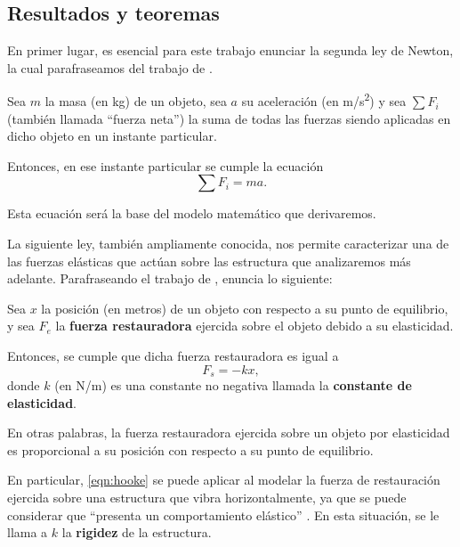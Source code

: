 \subsection{Resultados y teoremas}

En primer lugar, es esencial para este trabajo enunciar la segunda ley de Newton, la cual parafraseamos del trabajo de \citet{young}.

\begin{theorem}
    Sea \(m\) la masa (en \si{kg}) de un objeto, sea \(a\) su aceleración (en \si{m/s^2}) y sea \(\sum F_i\) (también llamada ``fuerza neta'') la suma de todas las fuerzas siendo aplicadas en dicho objeto en un instante particular.
    
        Entonces, en ese instante particular se cumple la ecuación
        \[
            \sum F_i = ma
        .\]
\end{theorem}

Esta ecuación será la base del modelo matemático que derivaremos.

La siguiente ley, también ampliamente conocida, nos permite caracterizar una de las fuerzas elásticas que actúan sobre las estructura que analizaremos más adelante. Parafraseando el trabajo de \citet{giuli}, enuncia lo siguiente:

\begin{theorem}
    Sea \(x\) la posición (en metros) de un objeto con respecto a su punto de equilibrio, y sea \(F_e\) la \textbf{fuerza restauradora} ejercida sobre el objeto debido a su elasticidad.
    
        Entonces, se cumple que dicha fuerza restauradora es igual a
        \begin{equation}\label{eqn:hooke}
            F_{s} = -kx
        ,\end{equation}
        donde \(k\) (en \si{N/m}) es una constante no negativa llamada la \textbf{constante de elasticidad}.
\end{theorem}

En otras palabras, la fuerza restauradora ejercida sobre un objeto por elasticidad es proporcional a su posición con respecto a su punto de equilibrio.

En particular, \eqref{eqn:hooke} se puede aplicar al modelar la fuerza de restauración ejercida sobre una estructura que vibra horizontalmente, ya que se puede considerar que ``presenta un comportamiento elástico'' \citep{tarque}. En esta situación, se le llama a \(k\) la \textbf{rigidez} de la estructura.


